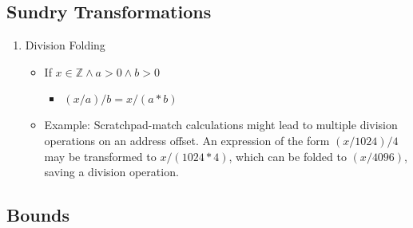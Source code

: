\hypertarget{sundry-transformations}{%
\subsection{Sundry Transformations}\label{sundry-transformations}}

\begin{enumerate}
\def\labelenumi{\arabic{enumi}.}
\tightlist
\item
  Division Folding

  \begin{itemize}
  \tightlist
  \item
    If \(x \in \mathbb{Z} \wedge a > 0 \wedge b > 0\)

    \begin{itemize}
    \tightlist
    \item
      \((x / a) / b = x / (a * b)\)
    \end{itemize}
  \item
    Example: Scratchpad-match calculations might lead to multiple
    division operations on an address offset. An expression of the form
    \((x / 1024) / 4\) may be transformed to \(x / (1024 * 4)\), which
    can be folded to \((x / 4096)\), saving a division operation.
  \end{itemize}
\end{enumerate}

\hypertarget{bounds}{%
\subsection{Bounds}\label{bounds}}


